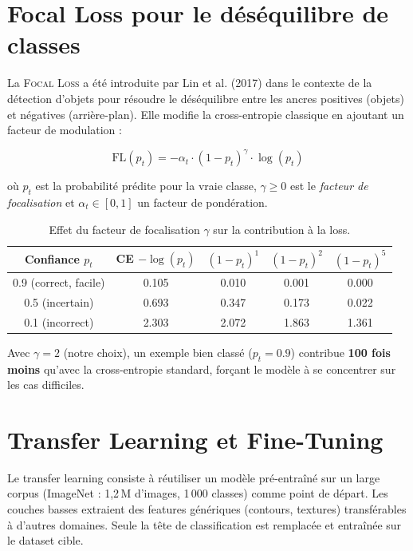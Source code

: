 \documentclass[12pt, a4paper, twoside]{report}
\newcommand{\focal}{\textsc{Focal Loss}}
\begin{document}
\section{Focal Loss pour le déséquilibre de classes}

La \focal{} a été introduite par Lin et al. (2017) dans le contexte de la détection d'objets pour résoudre le déséquilibre entre les ancres positives (objets) et négatives (arrière-plan). Elle modifie la cross-entropie classique en ajoutant un facteur de modulation :

\begin{equation}
\text{FL}(p_t) = -\alpha_t \cdot (1 - p_t)^{\gamma} \cdot \log(p_t)
\label{eq:focal-loss}
\end{equation}

où $p_t$ est la probabilité prédite pour la vraie classe, $\gamma \geq 0$ est le \textit{facteur de focalisation} et $\alpha_t \in [0,1]$ un facteur de pondération.

\begin{table}[H]
\centering
\caption{Effet du facteur de focalisation $\gamma$ sur la contribution à la loss.}
\label{tab:focal-effect}
\begin{tabular}{ccccc}
\toprule
\textbf{Confiance} $p_t$ & \textbf{CE} $-\log(p_t)$ & $(1-p_t)^1$ & $(1-p_t)^2$ & $(1-p_t)^5$ \\
\midrule
0.9 (correct, facile)    & 0.105 & 0.010 & 0.001 & 0.000 \\
0.5 (incertain)          & 0.693 & 0.347 & 0.173 & 0.022 \\
0.1 (incorrect)          & 2.303 & 2.072 & 1.863 & 1.361 \\
\bottomrule
\end{tabular}
\end{table}

Avec $\gamma = 2$ (notre choix), un exemple bien classé ($p_t = 0.9$) contribue \textbf{100 fois moins} qu'avec la cross-entropie standard, forçant le modèle à se concentrer sur les cas difficiles.

\section{Transfer Learning et Fine-Tuning}

Le transfer learning consiste à réutiliser un modèle pré-entraîné sur un large corpus (ImageNet : 1,2\,M d'images, 1\,000 classes) comme point de départ. Les couches basses extraient des features génériques (contours, textures) transférables à d'autres domaines. Seule la tête de classification est remplacée et entraînée sur le dataset cible.
\end{document}
